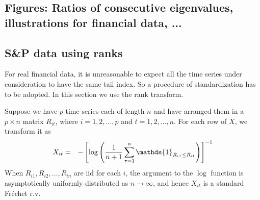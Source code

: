 \documentclass[11pt,reqno]{amsart}
\newcommand{\1}{\mathds{1}}
\newcommand{\0}{\boldsymbol{0}}
\newcommand{\4}{\mathchoice{\mskip1.5mu}{\mskip1.5mu}{}{}}
\newcommand{\5}{\mathchoice{\mskip-1.5mu}{\mskip-1.5mu}{}{}}
\newcommand{\2}{\penalty250\mskip\thickmuskip\mskip-\thinmuskip} %
\begin{document}
\subsection{Figures: Ratios of consecutive eigenvalues, illustrations for financial data, ...}
\subsection{S\&P data using ranks}
For real financial data, it is unreasonable to expect all
the time series under consideration to have the same tail index. So a
procedure of standardization has to be adopted. In this section we
use the rank transform.

Suppose we have $p$ time series each of length $n$ and have arranged
them in a $p\times n$ matrix $R_{it}$, where $i = 1, 2, \dots, p$ and
$t=1,2, \dots, n$. For each row of $X$, we transform it as
\begin{eqnarray*}
  X_{it} &=& -\left[
    \log \left({1 \over n+1} \sum_{\tau=1}^n \1_{R_{i\tau} \leq R_{it}} \right)
  \right]^{-1}
\end{eqnarray*}
When $R_{i1}, R_{i2}, \dots, R_{in}$ are iid for each $i$, the
argument to the $\log$ function is asymptotically uniformly
distributed as $n \to \infty$, and hence $X_{it}$ is a standard
Fr\'echet r.v.
\end{document}
